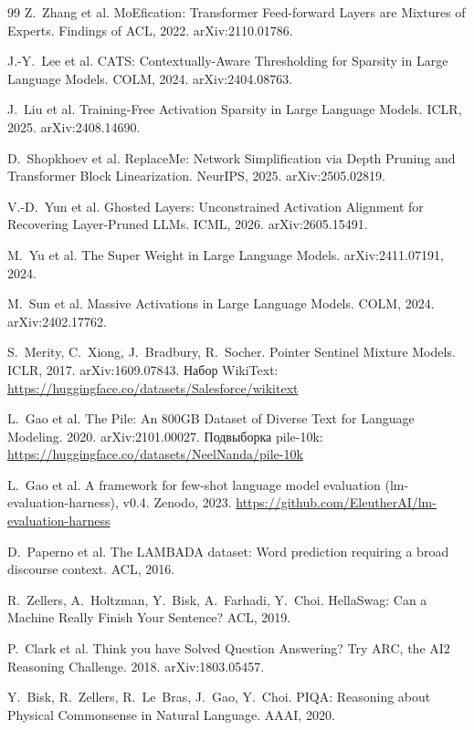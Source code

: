 \begin{thebibliography}{99}
Z.~Zhang et al. MoEfication: Transformer Feed-forward Layers are Mixtures of
Experts. Findings of ACL, 2022. arXiv:2110.01786.

J.-Y.~Lee et al. CATS: Contextually-Aware Thresholding for Sparsity in Large
Language Models. COLM, 2024. arXiv:2404.08763.

J.~Liu et al. Training-Free Activation Sparsity in Large Language Models.
ICLR, 2025. arXiv:2408.14690.

D.~Shopkhoev et al. ReplaceMe: Network Simplification via Depth Pruning and
Transformer Block Linearization. NeurIPS, 2025. arXiv:2505.02819.

V.-D.~Yun et al. Ghosted Layers: Unconstrained Activation Alignment for
Recovering Layer-Pruned LLMs. ICML, 2026. arXiv:2605.15491.

M.~Yu et al. The Super Weight in Large Language Models. arXiv:2411.07191,
2024.

M.~Sun et al. Massive Activations in Large Language Models. COLM, 2024.
arXiv:2402.17762.

S.~Merity, C.~Xiong, J.~Bradbury, R.~Socher. Pointer Sentinel Mixture Models. ICLR, 2017.
arXiv:1609.07843. Набор WikiText: \url{https://huggingface.co/datasets/Salesforce/wikitext}

L.~Gao et al. The Pile: An 800GB Dataset of Diverse Text for Language Modeling. 2020.
arXiv:2101.00027. Подвыборка pile-10k: \url{https://huggingface.co/datasets/NeelNanda/pile-10k}

L.~Gao et al. A framework for few-shot language model evaluation (lm-evaluation-harness), v0.4. Zenodo, 2023.
\url{https://github.com/EleutherAI/lm-evaluation-harness}

D.~Paperno et al. The LAMBADA dataset: Word prediction requiring a broad discourse context. ACL, 2016.

R.~Zellers, A.~Holtzman, Y.~Bisk, A.~Farhadi, Y.~Choi. HellaSwag: Can a Machine Really Finish Your Sentence? ACL, 2019.

P.~Clark et al. Think you have Solved Question Answering? Try ARC, the AI2 Reasoning Challenge. 2018. arXiv:1803.05457.

Y.~Bisk, R.~Zellers, R.~Le~Bras, J.~Gao, Y.~Choi. PIQA: Reasoning about Physical Commonsense in Natural Language. AAAI, 2020.


\end{thebibliography}

